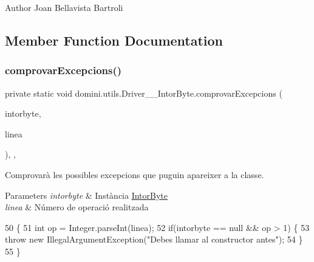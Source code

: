 \begin{DoxyAuthor}{Author}
Joan Bellavista Bartroli 
\end{DoxyAuthor}


\subsection{Member Function Documentation}
\mbox{\label{classdomini_1_1utils_1_1Driver____IntorByte_a3cb28e1e1b318e0b8e4809ebd171c8b2}} 
\subsubsection{\texorpdfstring{comprovar\+Excepcions()}{comprovarExcepcions()}}
{\footnotesize\ttfamily private static void domini.\+utils.\+Driver\+\_\+\+\_\+\+Intor\+Byte.\+comprovar\+Excepcions (\begin{DoxyParamCaption}\item[{\hyperlink{classdomini_1_1utils_1_1IntorByte}{Intor\+Byte}}]{intorbyte,  }\item[{String}]{linea }\end{DoxyParamCaption})\hspace{0.3cm}{\ttfamily [inline]}, {\ttfamily [static]}, {\ttfamily [private]}}



Comprovarà les possibles excepcions que puguin apareixer a la classe. 


\begin{DoxyParams}{Parameters}
{\em intorbyte} & Instància \hyperlink{classdomini_1_1utils_1_1IntorByte}{Intor\+Byte} \\
\hline
{\em linea} & Número de operació realitzada \\
\hline
\end{DoxyParams}

\begin{DoxyCode}
50                                                                               \{
51         \textcolor{keywordtype}{int} op = Integer.parseInt(linea);
52         \textcolor{keywordflow}{if}(intorbyte == null && op > 1) \{
53             \textcolor{keywordflow}{throw} \textcolor{keyword}{new} IllegalArgumentException(\textcolor{stringliteral}{"Debes llamar al constructor antes"});
54         \}
55     \}
\end{DoxyCode}
\mbox{\label{classdomini_1_1utils_1_1Driver____IntorByte_a82ac3bdc9baf9f3fa1b8984733d03240}} 
